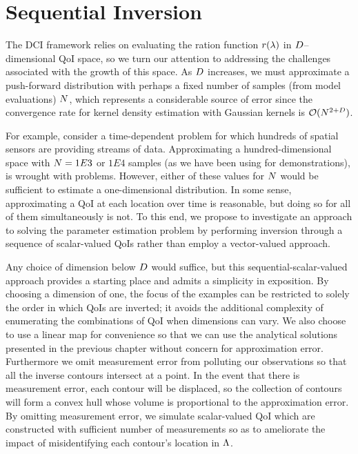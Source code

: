 
\section{Sequential Inversion}\label{sec:ch05-sequential}

The DCI framework relies on evaluating the ration function $r(\lambda)$ in $D$--dimensional QoI space, so we turn our attention to addressing the challenges associated with the growth of this space.
As $D$ increases, we must approximate a push-forward distribution with perhaps a fixed number of samples (from model evaluations) $N$, which represents a considerable source of error since the convergence rate for kernel density estimation with Gaussian kernels is $\mathcal{O} (N^{2+D})$.

For example, consider a time-dependent problem for which hundreds of spatial sensors are providing streams of data.
Approximating a hundred-dimensional space with $N = 1E3$ or $1E4$ samples (as we have been using for demonstrations), is wrought with problems.
However, either of these values for $N$ would be sufficient to estimate a one-dimensional distribution.
In some sense, approximating a QoI at each location over time is reasonable, but doing so for all of them simultaneously is not.
To this end, we propose to investigate an approach to solving the parameter estimation problem by performing inversion through a sequence of scalar-valued QoIs rather than employ a vector-valued approach.

Any choice of dimension below $D$ would suffice, but this sequential-scalar-valued approach provides a starting place and admits a simplicity in exposition.
By choosing a dimension of one, the focus of the examples can be restricted to solely the order in which QoIs are inverted; it avoids the additional complexity of enumerating the combinations of QoI when dimensions can vary.
We also choose to use a linear map for convenience so that we can use the analytical solutions presented in the previous chapter without concern for approximation error.
Furthermore we omit measurement error from polluting our observations so that all the inverse contours intersect at a point.
In the event that there is measurement error, each contour will be displaced, so the collection of contours will form a convex hull whose volume is proportional to the approximation error.
By omitting measurement error, we simulate scalar-valued QoI which are constructed with sufficient number of measurements so as to ameliorate the impact of misidentifying each contour's location in ${\Lambda}$.

